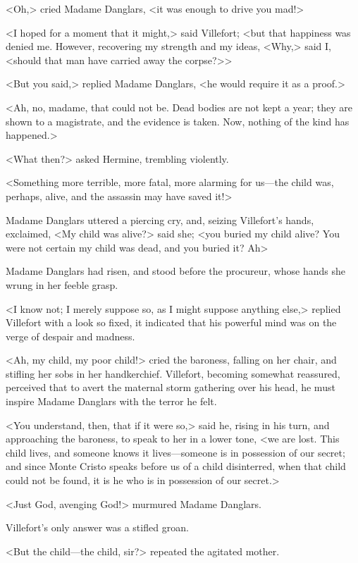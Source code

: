  <Oh,> cried Madame Danglars, <it was enough to drive you mad!> 

 <I hoped for a moment that it might,> said Villefort; <but that happiness was denied me. However, recovering my strength and my ideas, <Why,> said I, <should that man have carried away the corpse?>> 

 <But you said,> replied Madame Danglars, <he would require it as a proof.> 

 <Ah, no, madame, that could not be. Dead bodies are not kept a year; they are shown to a magistrate, and the evidence is taken. Now, nothing of the kind has happened.> 

 <What then?> asked Hermine, trembling violently. 

 <Something more terrible, more fatal, more alarming for us—the child was, perhaps, alive, and the assassin may have saved it!> 

 Madame Danglars uttered a piercing cry, and, seizing Villefort's hands, exclaimed, <My child was alive?> said she; <you buried my child alive? You were not certain my child was dead, and you buried it? Ah\longdash> 

 Madame Danglars had risen, and stood before the procureur, whose hands she wrung in her feeble grasp. 

 <I know not; I merely suppose so, as I might suppose anything else,> replied Villefort with a look so fixed, it indicated that his powerful mind was on the verge of despair and madness. 

 <Ah, my child, my poor child!> cried the baroness, falling on her chair, and stifling her sobs in her handkerchief. Villefort, becoming somewhat reassured, perceived that to avert the maternal storm gathering over his head, he must inspire Madame Danglars with the terror he felt. 

 <You understand, then, that if it were so,> said he, rising in his turn, and approaching the baroness, to speak to her in a lower tone, <we are lost. This child lives, and someone knows it lives—someone is in possession of our secret; and since Monte Cristo speaks before us of a child disinterred, when that child could not be found, it is he who is in possession of our secret.> 

 <Just God, avenging God!> murmured Madame Danglars. 

 Villefort's only answer was a stifled groan. 

 <But the child—the child, sir?> repeated the agitated mother. 

